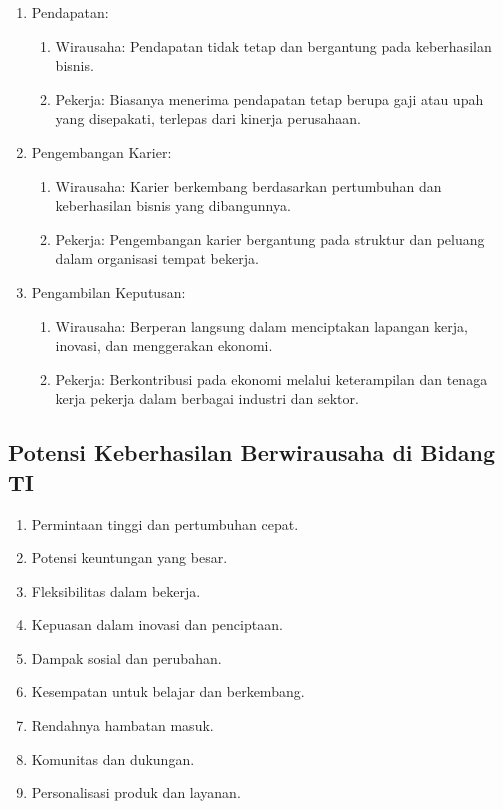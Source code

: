 \begin{enumerate}
\begin{enumerate}
\begin{enumerate}
    \item Pekerja: Jadwal kerja dan tugasnya lebih terstruktur dan ditentukan oleh kebijakan organisasi.
    \end{enumerate}
  \item Pendapatan:
    \begin{enumerate}
    \item Wirausaha: Pendapatan tidak tetap dan bergantung pada keberhasilan bisnis.
    \item Pekerja: Biasanya menerima pendapatan tetap berupa gaji atau upah yang disepakati, terlepas dari kinerja perusahaan.
    \end{enumerate}
  \item Pengembangan Karier:
    \begin{enumerate}
    \item Wirausaha: Karier berkembang berdasarkan pertumbuhan dan keberhasilan bisnis yang dibangunnya.
    \item Pekerja: Pengembangan karier bergantung pada struktur dan peluang dalam organisasi tempat bekerja.
    \end{enumerate}
  \item Pengambilan Keputusan:
    \begin{enumerate}
    \item Wirausaha: Berperan langsung dalam menciptakan lapangan kerja, inovasi, dan menggerakan ekonomi.
    \item Pekerja: Berkontribusi pada ekonomi melalui keterampilan dan tenaga kerja pekerja dalam berbagai industri dan sektor.
    \end{enumerate}
  \end{enumerate}
\end{enumerate}

\subsection{Potensi Keberhasilan Berwirausaha di Bidang TI}
\begin{enumerate}
\item Permintaan tinggi dan pertumbuhan cepat.
\item Potensi keuntungan yang besar.
\item Fleksibilitas dalam bekerja.
\item Kepuasan dalam inovasi dan penciptaan.
\item Dampak sosial dan perubahan.
\item Kesempatan untuk belajar dan berkembang.
\item Rendahnya hambatan masuk.
\item Komunitas dan dukungan.
\item Personalisasi produk dan layanan.
\end{enumerate}
